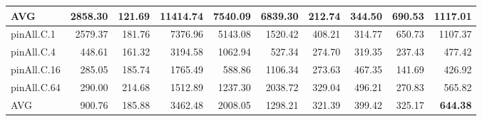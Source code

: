 \begin{table*}[]
\begin{center}
\begin{tabular}{|l|rrrrrrrr|r|}
 \hline
 AVG          & 2858.30 & 121.69 & 11414.74 &  7540.09 &  6839.30 & 212.74 & 344.50 &  690.53 & \textbf{1117.01} \\
 \hline
 pinAll.C.1   & 2579.37 & 181.76 &  7376.96 &  5143.08 &  1520.42 & 408.21 & 314.77 &  650.73 & 1107.37 \\
 pinAll.C.4   &  448.61 & 161.32 &  3194.58 &  1062.94 &   527.34 & 274.70 & 319.35 &  237.43 &  477.42 \\
 pinAll.C.16  &  285.05 & 185.74 &  1765.49 &   588.86 &  1106.34 & 273.63 & 467.35 &  141.69 &  426.92 \\
 pinAll.C.64  &  290.00 & 214.68 &  1512.89 &  1237.30 &  2038.72 & 329.04 & 496.21 &  270.83 &  565.82 \\
 \hline
 AVG          &  900.76 & 185.88 &  3462.48 &  2008.05 &  1298.21 & 321.39 & 399.42 &  325.17 &  \textbf{644.38} \\
\hline
\end{tabular}
\end{center}
\end{table*}
